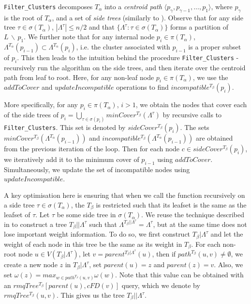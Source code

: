 \documentclass{article}
\newcommand{\leafset}{\Lambda}
\newcommand{\weight}{\omega}
\newcommand{\TA}{T_\alpha}
\newcommand{\TB}{T_\beta}
\begin{document}
    \texttt{Filter\_Clusters} decomposes $\TA$ into a \textit{centroid path} $\langle p_{\gamma}, p_{\gamma - 1}, \dots, p_1 \rangle$, where $p_{\gamma}$ is the root of $\TA$, and a set of \textit{side trees} (similarly to \cite{jansson2018algorithms}). Observe that for any side tree $\tau \in \sigma(\TA)$, $|\leafset^\tau| \leq n/2$ and that $\{\leafset^{\tau} : \tau \in \sigma(\TA)\}$ forms a partition of $L\, \backslash\, {p_1}$. We further note that for any internal node $p_i \in \pi(\TA)$, $\leafset^{\TA}(p_{i - 1}) \subset \leafset^{\TA}(p_i)$, i.e. the cluster associated with $p_{i-1}$ is a proper subset of $p_i$. This then leads to the intuition behind the procedure \texttt{Filter\_Clusters} - recursively run the algorithm on the side trees, and then iterate over the centroid path from leaf to root. Here, for any non-leaf node $p_i \in \pi(\TA)$, we use
    the $addToCover$ and $updateIncompatible$ operations to find $incompatible^{\TB}(p_i)$.

    More specifically, for any $p_i \in \pi(\TA)$, $i > 1$, we obtain the nodes that cover each of the side trees of $p_i = \bigcup_{\tau \in \sigma(p_i)} minCover^{\TB}(\leafset^{\tau})$ by recursive calls to \texttt{Filter\_Clusters}. This set is denoted by   $sideCover^{\TB}(p_i)$. The sets $minCover^{\TB}(\leafset^{\TA}(p_{i-1}))$ and $incompatible^{\TB}(\leafset^{\TA}(p_{i-1}))$ are obtained from the previous iteration of the loop. Then for each node $c \in sideCover^{\TB}(p_i)$, we iteratively add it to the minimum cover of $p_{i-1}$ using $addToCover$. Simultaneously, we update the set of incompatible nodes using $updateIncompatible$.

    A key optimisation here is ensuring that when we call the function recursively on a side tree $\tau \in \sigma(\TA)$, the $\TB$ is restricted such that its leafset is the same as the leafset of $\tau$. Let $\tau$ be some side tree in $\sigma(\TA)$. We reuse the technique described in \cite{jansson2018algorithms} to construct a tree $\TB||\leafset^{\tau}$ such that $\leafset^{\TB||\leafset^{\tau}} = \leafset^{\tau}$, but at the same time does not lose important weight information. To do so, we first construct $\TB|\leafset^{\tau}$ and let the weight of each node in this tree be the same as its weight in $\TB$. For each non-root node $u \in V(\TB|\leafset^{\tau})$, let $v = parent^{\TB|\leafset^{\tau}}(u)$, then if $path^{\TB}(u, v) \neq \emptyset$, we create a new node $z$ in $\TB|\leafset^{\tau}$, set $parent(u) = z$ and $parent(z) = v$. Also, we set $\weight(z) = max_{w \in path^{\TB}(u, v)} \weight(w)$. Note that this value can be obtained with an $rmqTree^{\TB}[parent(u), cFD(v)]$ query, which we denote by $rmqTree^{\TB}(u, v)$. This gives us the tree $\TB||\leafset^{\tau}$.
\end{document}
